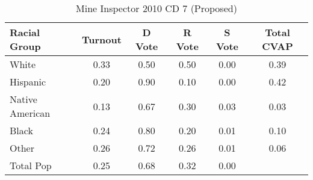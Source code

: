 \begin{table}[htb]
\begin{center}
\caption{Mine Inspector 2010 CD 7 (Proposed)}
\label{smine_cvap_cd_7}
\begin{tabular}{lccccc}
  \hline
Racial Group & Turnout & D Vote & R Vote & S Vote & Total CVAP \\ 
  \hline
White & 0.33 & 0.50 & 0.50 & 0.00 & 0.39 \\ 
  Hispanic & 0.20 & 0.90 & 0.10 & 0.00 & 0.42 \\ 
  Native American & 0.13 & 0.67 & 0.30 & 0.03 & 0.03 \\ 
  Black & 0.24 & 0.80 & 0.20 & 0.01 & 0.10 \\ 
  Other & 0.26 & 0.72 & 0.26 & 0.01 & 0.06 \\ 
  Total Pop & 0.25 & 0.68 & 0.32 & 0.00 &  \\ 
   \hline
\end{tabular}
\end{center}
\end{table}
